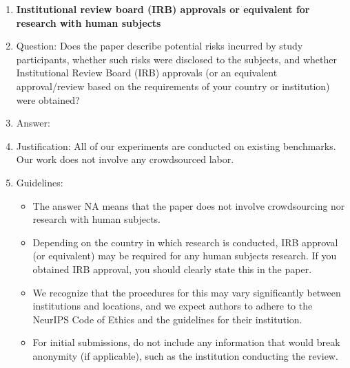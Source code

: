 \documentclass{article}
\begin{document}
\begin{enumerate}
\item {\bf Institutional review board (IRB) approvals or equivalent for research with human subjects}
    \item[] Question: Does the paper describe potential risks incurred by study participants, whether such risks were disclosed to the subjects, and whether Institutional Review Board (IRB) approvals (or an equivalent approval/review based on the requirements of your country or institution) were obtained?
    \item[] Answer: \answerNA{} %
    \item[] Justification: All of our experiments are conducted on existing benchmarks. Our work does not involve any crowdsourced labor.
    \item[] Guidelines:
    \begin{itemize}
        \item The answer NA means that the paper does not involve crowdsourcing nor research with human subjects.
        \item Depending on the country in which research is conducted, IRB approval (or equivalent) may be required for any human subjects research. If you obtained IRB approval, you should clearly state this in the paper. 
        \item We recognize that the procedures for this may vary significantly between institutions and locations, and we expect authors to adhere to the NeurIPS Code of Ethics and the guidelines for their institution. 
        \item For initial submissions, do not include any information that would break anonymity (if applicable), such as the institution conducting the review.
    \end{itemize}


\end{enumerate}
\end{document}

